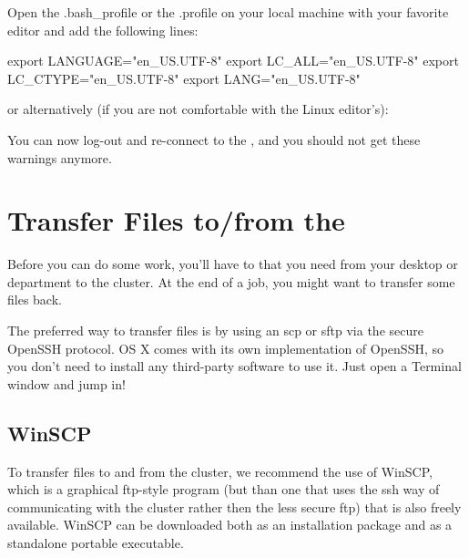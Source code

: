Open the .bash\_profile or the .profile on your local machine with your
favorite editor and add the following lines:

\begin{prompt}
export LANGUAGE="en_US.UTF-8"
export LC\_ALL="en_US.UTF-8"
export LC\_CTYPE="en_US.UTF-8"
export LANG="en_US.UTF-8"
\end{prompt}

or alternatively (if you are not comfortable with the Linux editor's):

\begin{prompt}
\end{prompt}

You can now log-out and re-connect to the \hpc, and you should not get these warnings anymore.

\section{Transfer Files to/from the \hpc}

Before you can do some work, you'll have to  that
you need from your desktop or department to the cluster. At the end of a job,
you might want to transfer some files back.

The preferred way to transfer files is by using an scp or sftp via the secure
OpenSSH protocol.  OS X comes with its own implementation of OpenSSH, so you
don't need to install any third-party software to use it. Just open a Terminal
window and jump in!

\ifwindows

\subsection{WinSCP}

To transfer files to and from the cluster, we recommend the use of WinSCP,
which is a graphical ftp-style program (but than one that uses the ssh way of
communicating with the cluster rather then the less secure ftp) that is also
freely available. WinSCP can be downloaded both as an installation package and
as a standalone portable executable.

